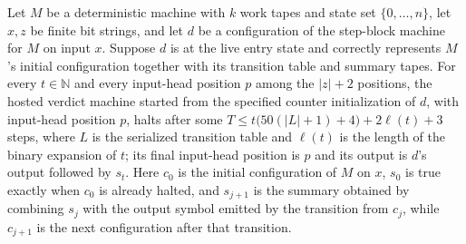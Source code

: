 \begin{theorem}
\label{Turing.MachineFormat.h1HostedVerdict_effect}
\leanok
{}
Let $M$ be a deterministic machine with $k$ work tapes and state set $\{0,\ldots,n\}$,
let $x,z$ be finite bit strings, and let $d$ be a configuration of the step-block
machine for $M$ on input $x$. Suppose $d$ is at the live entry state and correctly
represents $M$'s initial configuration together with its transition table and summary
tapes. For every $t\in\mathbb N$ and every input-head position $p$ among the $|z|+2$
positions, the hosted verdict machine started from the specified counter initialization
of $d$, with input-head position $p$, halts after some $T\le
t\bigl(50(|L|+1)+4\bigr)+2\ell(t)+3$ steps, where $L$ is the serialized transition table
and $\ell(t)$ is the length of the binary expansion of $t$; its final input-head
position is $p$ and its output is $d$'s output followed by $s_t$. Here $c_0$ is the
initial configuration of $M$ on $x$, $s_0$ is true exactly when $c_0$ is already halted,
and $s_{j+1}$ is the summary obtained by combining $s_j$ with the output symbol emitted
by the transition from $c_j$, while $c_{j+1}$ is the next configuration after that
transition.
\end{theorem}

